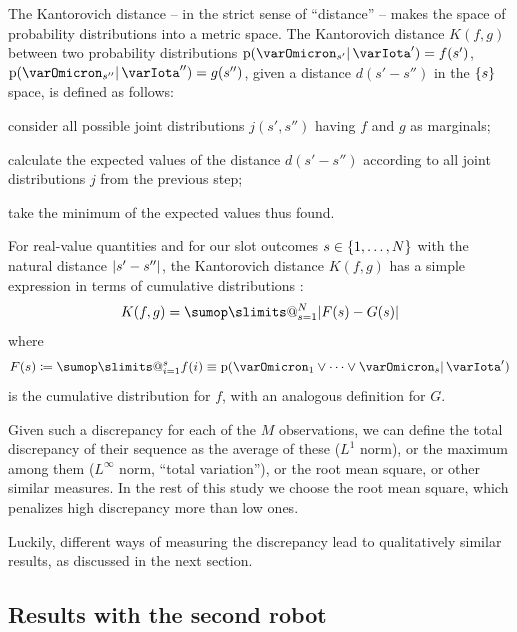\documentclass[\ifafour a4paper,12pt,\else a5paper,10pt,\fi%
onecolumn,oneside,article,%
british%
]{memoir}
\makeatletter
\theoremstyle{remark}
\theoremstyle{innote}
\def\sum{\DOTSI\sumop\slimits@}
\newcommand*{\citep}{\parencites}
\newcommand*{\defd}{\coloneqq}
\DeclarePairedDelimiter\abs{\lvert}{\rvert}
\DeclarePairedDelimiter\set{\{}{\}}
\newcommand*{\pf}{\mathrm{p}}%
\renewcommand*{\|}{\mathpunct{|}}
\newcommand*{\sect}{\S}%
\newcommand*{\chap}{ch.}%
\newcommand*{\yI}{\varIota}
\newcommand*{\yO}{\varOmicron}
\makeatother
\begin{document}
The Kantorovich distance -- in the strict sense of \enquote{distance}
\citep[\sect~I.C.11]{choquetbruhatetal1977_r1996}[\chap~2]{rudin1953_r1976}
-- makes the space of probability distributions into a metric space. The
Kantorovich distance $K(f,g)$ between two probability distributions
$\pf(\yO_{s'} \|\yI')=f(s')$, $\pf(\yO_{s''} \|\yI'')=g(s'')$, given a
distance $d(s'-s'')$ in the $\set{s}$ space, is defined as follows:
\begin{enumerate*}[label=(\emph{\arabic*})]
\item consider all possible joint distributions $j(s',s'')$ having $f$ and
  $g$ as marginals;
\item calculate the expected values of the distance $d(s'-s'')$ according
  to all joint distributions $j$ from the previous step;
\item take the minimum of the expected values thus found.
\end{enumerate*}
For real-value quantities and for our slot outcomes
$s \in \set{1,\dotsc, N}$ with the natural distance $\abs{s'-s''}$, the
Kantorovich distance $K(f,g)$ has a simple expression in terms of
cumulative distributions \citep{vallender1972}:
\begin{equation}
  \label{eq:kantorovich_simple_formula}
K(f,g) =  \sum_{s=1}^N \abs{F(s)-G(s)}
\end{equation}
where
\begin{equation}
  \label{eq:cumulative_def}
  F(s) \defd \sum_{i=1}^s f(i) \equiv
  \pf(\yO_{1}\lor\dotsb\lor\yO_{s}\|\yI')
\end{equation}
is the cumulative distribution for $f$, with an analogous definition for
$G$.


Given such a discrepancy for each of the $M$ observations, we can define
the total discrepancy of their sequence as the average of these ($L^1$
norm), or the maximum among them ($L^{\infty}$ norm, \enquote{total
  variation}), or the root mean square, or other similar measures. In the
rest of this study we choose the root mean square, which penalizes high
discrepancy more than low ones.

\medskip

Luckily, different ways of measuring the discrepancy lead to qualitatively
similar results, as discussed in the next section.


\subsection{Results with the second robot}
\label{sec:results_2nd_robot}
\end{document}
